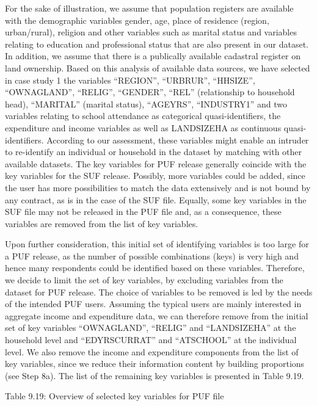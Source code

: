 \documentclass[letterpaper,10pt,english]{sphinxmanual}
\begin{document}
For the sake of illustration, we assume that population registers are
available with the demographic variables gender, age, place of residence
(region, urban/rural), religion and other variables such as marital
status and variables relating to education and professional status that
are also present in our dataset. In addition, we assume that there is a
publically available cadastral register on land ownership. Based on this
analysis of available data sources, we have selected in case study 1 the
variables “REGION”, “URBRUR”, “HHSIZE”, “OWNAGLAND”, “RELIG”, “GENDER”,
“REL” (relationship to household head), “MARITAL” (marital status),
“AGEYRS”, “INDUSTRY1” and two variables relating to school attendance as
categorical quasi-identifiers, the expenditure and income variables as
well as LANDSIZEHA as continuous quasi-identifiers. According to our
assessment, these variables might enable an intruder to re-identify an
individual or household in the dataset by matching with other available
datasets. The key variables for PUF release generally coincide with the
key variables for the SUF release. Possibly, more variables could be
added, since the user has more possibilities to match the data
extensively and is not bound by any contract, as is in the case of the
SUF file. Equally, some key variables in the SUF file may not be
released in the PUF file and, as a consequence, these variables are
removed from the list of key variables.

Upon further consideration, this initial set of identifying variables is
too large for a PUF release, as the number of possible combinations
(keys) is very high and hence many respondents could be identified based
on these variables. Therefore, we decide to limit the set of key
variables, by excluding variables from the dataset for PUF release. The
choice of variables to be removed is led by the needs of the intended
PUF users. Assuming the typical users are mainly interested in aggregate
income and expenditure data, we can therefore remove from the initial
set of key variables “OWNAGLAND”, “RELIG” and “LANDSIZEHA” at the
household level and “EDYRSCURRAT” and “ATSCHOOL” at the individual
level. 
We also remove the income and expenditure components from the list of
key variables, since we reduce their information content by building
proportions (see Step 8a). The list of the remaining key variables is
presented in Table 9.19.

Table 9.19: Overview of selected key variables for PUF file
\end{document}
